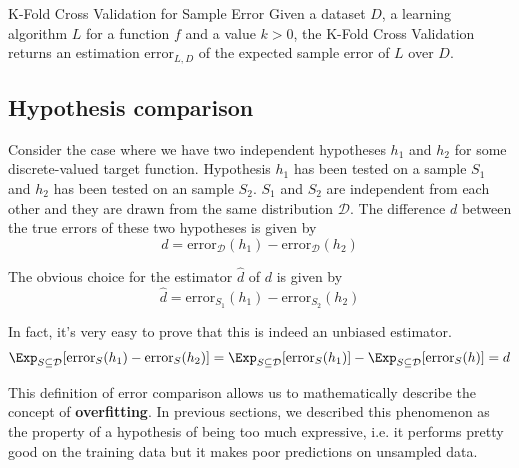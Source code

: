 \documentclass[a4paper, 12pt]{report}
\begin{document}
    \begin{framedalgo}{K-Fold Cross Validation for Sample Error}
        Given a dataset $D$, a learning algorithm $L$ for a function $f$ and a value $k > 0$, the K-Fold Cross Validation returns an estimation $\mathrm{error}_{L,D}$ of the expected sample error of $L$ over $D$.
        \begin{algorithmic}
                \EndFor
            \EndFunction
        \end{algorithmic}
    \end{framedalgo}

    \subsection{Hypothesis comparison}

    Consider the case where we have two independent hypotheses $h_1$ and $h_2$ for some discrete-valued target function. Hypothesis $h_1$ has been tested on a sample $S_1$ and $h_2$ has been tested on an sample $S_2$. $S_1$ and $S_2$ are independent from each other and they are drawn from the same distribution $\mathcal{D}$. The difference $d$ between the true errors of these two hypotheses is given by 
    \[d = \mathrm{error}_\mathcal{D}(h_1) - \mathrm{error}_\mathcal{D}(h_2)\]

    The obvious choice for the estimator $\widehat{d}$ of $d$ is given by
    \[\widehat{d} = \mathrm{error}_{S_1}(h_1) - \mathrm{error}_{S_2}(h_2)\]

    In fact, it's very easy to prove that this is indeed an unbiased estimator.
    \[\Exp_{S \subseteq \mathcal{D}}[\mathrm{error}_{S}(h_1) - \mathrm{error}_{S}(h_2)] = \Exp_{S \subseteq \mathcal{D}}[\mathrm{error}_{S}(h_1)] - \Exp_{S \subseteq \mathcal{D}}[\mathrm{error}_{S}(h)] = d\]

    This definition of error comparison allows us to mathematically describe the concept of \textbf{overfitting}. In previous sections, we described this phenomenon as the property of a hypothesis of being too much expressive, i.e. it performs pretty good on the training data but it makes poor predictions on unsampled data.
\end{document}

